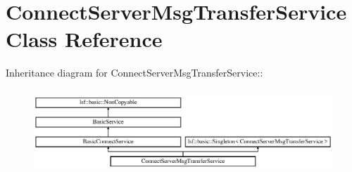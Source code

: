 \hypertarget{classConnectServerMsgTransferService}{
\section{ConnectServerMsgTransferService Class Reference}
\label{classConnectServerMsgTransferService}
}
Inheritance diagram for ConnectServerMsgTransferService::\begin{figure}[H]
\begin{center}
\leavevmode
\includegraphics[height=3.1728cm]{classConnectServerMsgTransferService}
\end{center}
\end{figure}
